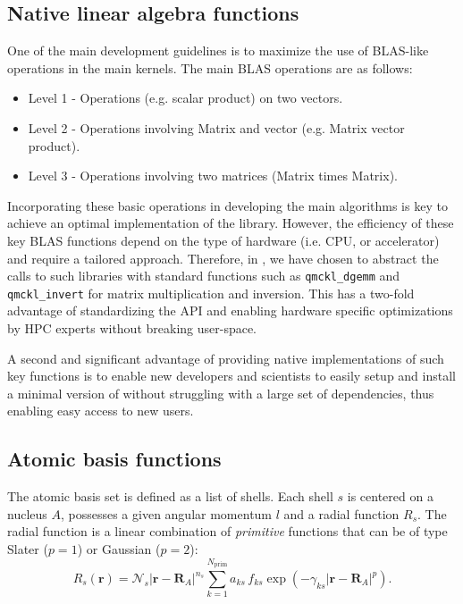 \subsection{Native linear algebra functions}

One of the main development guidelines is to maximize the use
of \ac{BLAS}-like operations in the main kernels. The main \ac{BLAS} operations are
as follows:

\begin{itemize}
\item Level 1 - Operations (e.g. scalar product) on two vectors.
\item Level 2 - Operations involving Matrix and vector (e.g. Matrix vector product).
\item Level 3 - Operations involving two matrices (Matrix times Matrix).
\end{itemize}

Incorporating these basic operations in developing the main algorithms is key to
achieve an optimal implementation of the library. However, the efficiency of these key \ac{BLAS}
functions depend on the type of hardware (i.e. CPU, or accelerator) and require a
tailored approach. Therefore, in \QMCkl{}, we have chosen to abstract the
calls to such libraries with standard \QMCkl{} functions such as
\texttt{qmckl_dgemm} and \texttt{qmckl_invert} for matrix
multiplication and inversion. This has a two-fold advantage of standardizing
the \ac{API} and enabling hardware specific optimizations by \ac{HPC} experts
without breaking user-space.

A second and significant advantage of providing native implementations of
such key functions is to enable new developers and scientists to easily
setup and install a minimal version of \QMCkl{} without struggling with
a large set of dependencies, thus enabling easy access to new users.

\subsection{Atomic basis functions}

The atomic basis set is defined as a list of shells. Each shell $s$ is
centered on a nucleus $A$, possesses a given angular momentum $l$ and a
radial function $R_s$. The radial function is a linear combination of
\emph{primitive} functions that can be of type Slater ($p=1$)  or
Gaussian ($p=2$):
\[
  R_s(\mathbf{r}) = \mathcal{N}_s |\mathbf{r}-\mathbf{R}_A|^{n_s}
  \sum_{k=1}^{N_{\text{prim}}} a_{ks}\, f_{ks}
 \exp \left( - \gamma_{ks} | \mathbf{r}-\mathbf{R}_A | ^p \right).
\]

